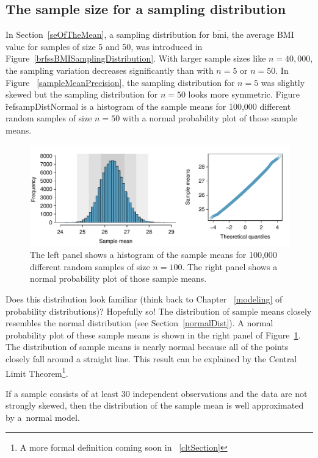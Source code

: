 \subsection{The sample size for a sampling distribution}
\label{sampdistmean}

In Section~\ref{seOfTheMean}, a sampling distribution for $\bar{\mathrm{bmi}}$, the average BMI value for samples of size 5 and 50, was introduced in Figure~\ref{brfssBMISamplingDistribution}. With larger sample sizes like $n=40,000$, the sampling variation decreases significantly than with $n=5$ or $n=50$. In Figure ~\ref{sampleMeanPrecision}, the sampling distribution for $n=5$ was slightly skewed but the sampling distribution for $n=50$ looks more symmetric. Figure \~ref{sampDistNormal} is a histogram of the sample means for 100,000 different random samples of size $n=50$ with a normal probability plot of those sample means. 

\begin{figure}[hht]
   \centering
   \includegraphics[width=\textwidth]{ch_inference_foundations_oi_biostat/figures/sampDistNormal/sampDistNormal}
   \caption{The left panel shows a histogram of the sample means for 100,000 different random samples of size $n=100$. The right panel shows a normal probability plot of those sample means.}
   \label{sampDistNormal}
\end{figure}

Does this distribution look familiar (think back to Chapter ~\ref{modeling} of probability distributions)? Hopefully so! The distribution of sample means closely resembles the normal distribution (see Section~\ref{normalDist}). A normal probability plot of these sample means is shown in the right panel of Figure~\ref{sampDistNormal}. The distribution of sample means is nearly normal because all of the points closely fall around a straight line. This result can be explained by the Central Limit Theorem\footnote{A more formal definition coming soon in ~\ref{cltSection}}.

\begin{termBox}{
If a sample consists of at least 30 independent observations and the data are not strongly skewed, then the distribution of the sample mean is well approximated by a~normal model.}
\end{termBox}

